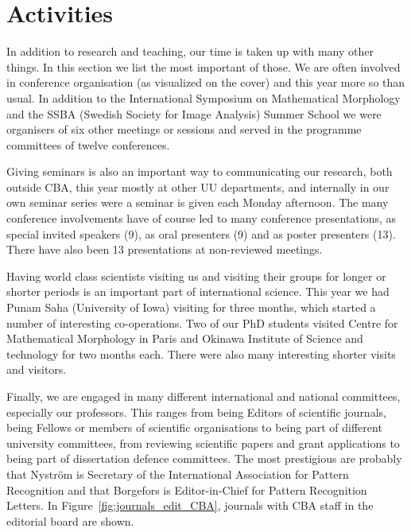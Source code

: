 %

\section{Activities}
{\large
In addition to research and teaching, our time is taken up with many other things. In this section we list the most important of those. We are often involved in conference organisation (as visualized on the cover) and this year more so than usual. In addition to the International Symposium on Mathematical Morphology and the SSBA (Swedish Society for Image Analysis) Summer School we were organisers of six other meetings or sessions and served in the programme committees of twelve conferences. 

Giving seminars is also an important way to communicating our research, both outside CBA, this year mostly at other UU departments, and internally in our own seminar series were a seminar is given each Monday afternoon. The many conference involvements have of course led to many conference presentations, as special invited speakers (9), as oral presenters (9) and as poster presenters (13). There have also been 13 presentations at non-reviewed meetings. 

Having world class scientists visiting us and visiting their groups for longer or shorter periods is an important part of international science. This year we had Punam Saha (University of Iowa) visiting for three months, which started a number of interesting co-operations. Two of our PhD students visited Centre for Mathematical Morphology in Paris and Okinawa Institute of Science and technology for two months each. There were also many interesting shorter visits and visitors. 

Finally, we are engaged in many different international and national committees, especially our professors. This ranges from being Editors of scientific journals, being Fellows or members of scientific organisations to being part of different university committees, from reviewing scientific papers and grant applications to being part of dissertation defence committees. The most prestigious are probably that Nystr\"{o}m is Secretary of the International Association for Pattern Recognition and that Borgefors is Editor-in-Chief for Pattern Recognition Letters. In Figure~\ref{fig:journals_edit_CBA}, journals with CBA staff in the editorial board are shown.

}

